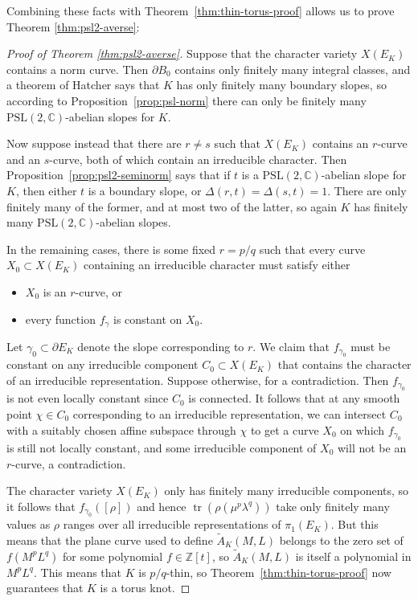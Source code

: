 \documentclass[11pt]{amsart}
\numberwithin{equation}{section}
\numberwithin{theorem}{section}
\theoremstyle{definition}
\newcommand{\Z}{\mathbb{Z}}
\newcommand{\C}{\mathbb{C}}
\newcommand\PSL{\mathrm{PSL}}
\newcommand{\tr}{\operatorname{tr}}
\begin{document}
Combining these facts with Theorem~\ref{thm:thin-torus-proof} allows us to prove Theorem \ref{thm:psl2-averse}:


\begin{proof}[Proof of Theorem \ref{thm:psl2-averse}]
Suppose that the character variety $X(E_K)$ contains a norm curve.  Then $\partial B_0$ contains only finitely many integral classes, and a theorem of Hatcher \cite{hatcher-slopes} says that $K$ has only finitely many boundary slopes, so according to Proposition~\ref{prop:psl-norm} there can only be finitely many $\PSL(2,\C)$-abelian slopes for $K$.

Now suppose instead that there are $r\neq s$ such that $X(E_K)$ contains an $r$-curve and an $s$-curve, both of which contain an irreducible character.  Then Proposition~\ref{prop:psl2-seminorm} says that if $t$ is a $\PSL(2,\C)$-abelian slope for $K$, then either $t$ is a boundary slope, or $\Delta(r,t) = \Delta(s,t) = 1$.  There are only finitely many of the former, and at most two of the latter, so again $K$ has finitely many $\PSL(2,\C)$-abelian slopes.

In the remaining cases, there is some fixed $r=p/q$ such that every curve $X_0 \subset X(E_K)$ containing an irreducible character must satisfy either
\begin{itemize}
\item $X_0$ is an $r$-curve, or
\item every function $f_\gamma$ is constant on $X_0$.
\end{itemize}
Let $\gamma_0 \subset \partial E_K$ denote the slope corresponding to $r$.  We claim that $f_{\gamma_0}$ must be constant on any irreducible component $C_0 \subset X(E_K)$ that contains the character of an irreducible representation.  Suppose otherwise, for a contradiction. Then  $f_{\gamma_0}$ is not even  locally constant since $C_0$ is connected. It follows that at any smooth point $\chi \in C_0$ corresponding to an irreducible representation, we can intersect $C_0$ with a suitably chosen affine subspace through $\chi$ to get a curve $X_0$ on which $f_{\gamma_0}$ is still not locally constant, and some irreducible component of $X_0$ will not be an $r$-curve, a contradiction.

The character variety $X(E_K)$ only has finitely many irreducible components, so it follows that $f_{\gamma_0}([\rho])$ and hence $\tr(\rho(\mu^p\lambda^q))$ take only finitely many values as $\rho$ ranges over all irreducible representations of $\pi_1(E_K)$.  But this means that the plane curve used to define $\tilde{A}_K(M,L)$ belongs to the zero set of  $f(M^pL^q)$ for some polynomial $f\in \Z[t]$, so $\tilde{A}_K(M,L)$ is itself a polynomial in $M^pL^q$.  This means that $K$ is $p/q$-thin, so Theorem~\ref{thm:thin-torus-proof} now guarantees that $K$ is a torus knot.
\end{proof}
\end{document}
